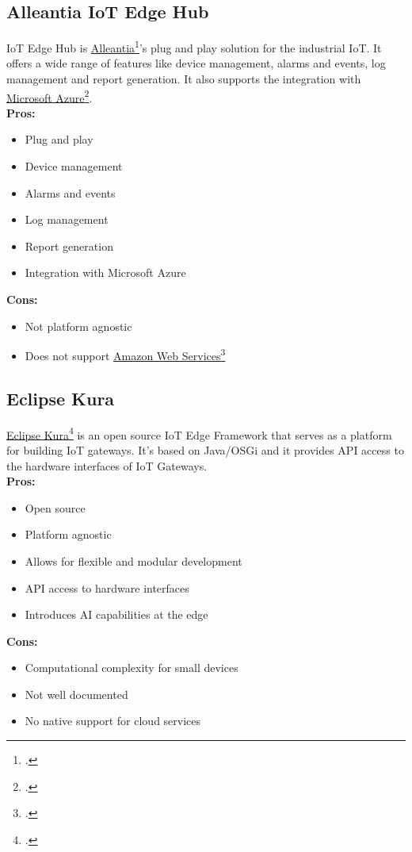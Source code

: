 \subsection{Alleantia IoT Edge Hub}
\label{alleantia}
IoT Edge Hub is \href{www.alleantia.com}{Alleantia}\footcite{site:alleantia}'s plug and play solution for the industrial IoT.
It offers a wide range of features like device management, alarms and events, log management and report generation.
It also supports the integration with \href{https://www.microsoft.com/it-it/azure}{Microsoft Azure}\footcite{site:azure}.\\
\textbf{Pros:}
\begin{itemize}
    \item Plug and play
    \item Device management
    \item Alarms and events
    \item Log management
    \item Report generation
    \item Integration with Microsoft Azure
\end{itemize}
\textbf{Cons:}
\begin{itemize}
    \item Not platform agnostic
    \item Does not support \href{https://aws.amazon.com/it/}{Amazon Web Services}\footcite{site:aws}
\end{itemize}

\subsection{Eclipse Kura}
\label{kura}
\href{https://eclipse.dev/kura/}{Eclipse Kura}\footcite{site:kura} is an open source IoT Edge Framework that serves as a platform for building IoT gateways.
It's based on Java/OSGi and it provides API access to the hardware interfaces of IoT Gateways.\\
\textbf{Pros:}
\begin{itemize}
    \item Open source
    \item Platform agnostic
    \item Allows for flexible and modular development
    \item API access to hardware interfaces
    \item Introduces AI capabilities at the edge
\end{itemize}
\textbf{Cons:}  
\begin{itemize}
    \item Computational complexity for small devices
    \item Not well documented
    \item No native support for cloud services
\end{itemize}

